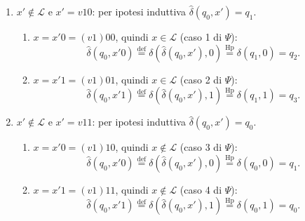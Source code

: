 \documentclass[a4paper, 11pt, oneside]{book}
\theoremstyle{formale}
\begin{document}
\begin{enumerate}
\begin{enumerate}[label=\arabic{enumi}\alph*.]
                    \begin{equation*}
                        \hat{\delta}(q_0, x'1)
                        \overset{\text{def}}{=} \delta(\hat{\delta}(q_0, x'), 1)
                        \overset{\text{Hp}}{=} \delta(q_3, 1) = q_0.
                    \end{equation*}
            \end{enumerate}
        \item $x' \notin \mathcal{L}$ e $x' = v10$: per ipotesi induttiva
            $\hat{\delta}(q_0, x') = q_1$.
            \begin{enumerate}[label=\arabic{enumi}\alph*.]
                \item $x = x'0 = (v1)00$, quindi $x \in \mathcal{L}$ (caso 1 di $\Psi$):
                    \begin{equation*}
                        \hat{\delta}(q_0, x'0)
                        \overset{\text{def}}{=} \delta(\hat{\delta}(q_0, x'), 0)
                        \overset{\text{Hp}}{=} \delta(q_1, 0) = q_2.
                    \end{equation*}
                \item $x = x'1 = (v1)01$, quindi $x \in \mathcal{L}$ (caso 2 di $\Psi$):
                    \begin{equation*}
                        \hat{\delta}(q_0, x'1)
                        \overset{\text{def}}{=} \delta(\hat{\delta}(q_0, x'), 1)
                        \overset{\text{Hp}}{=} \delta(q_1, 1) = q_3.
                    \end{equation*}
            \end{enumerate}
        \item $x' \notin \mathcal{L}$ e $x' = v11$: per ipotesi induttiva
            $\hat{\delta}(q_0, x') = q_0$.
            \begin{enumerate}[label=\arabic{enumi}\alph*.]
                \item $x = x'0 = (v1)10$, quindi $x \notin \mathcal{L}$ (caso 3 di $\Psi$):
                    \begin{equation*}
                        \hat{\delta}(q_0, x'0)
                        \overset{\text{def}}{=} \delta(\hat{\delta}(q_0, x'), 0)
                        \overset{\text{Hp}}{=} \delta(q_0, 0) = q_1.
                    \end{equation*}
                \item $x = x'1 = (v1)11$, quindi $x \notin \mathcal{L}$ (caso 4 di $\Psi$):
                    \begin{equation*}
                        \hat{\delta}(q_0, x'1)
                        \overset{\text{def}}{=} \delta(\hat{\delta}(q_0, x'), 1)
                        \overset{\text{Hp}}{=} \delta(q_0, 1) = q_0.
                    \end{equation*}
            \end{enumerate}
    \end{enumerate}
\end{document}
